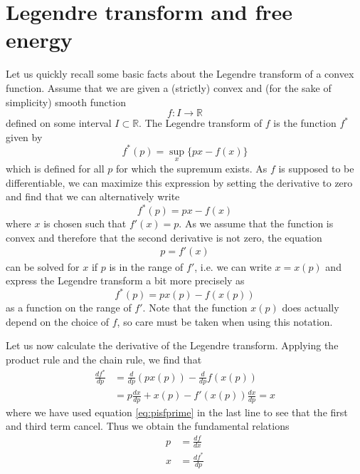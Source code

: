 \documentclass[a4paper, draft]{report}
\numberwithin{section}{chapter}
\numberwithin{equation}{chapter}
\theoremstyle{own}
\theoremstyle{remark}
\newcommand{\R}{\mathbb{R}}
\begin{document}
\section{Legendre transform and free energy}

Let us quickly recall some basic facts about the Legendre transform of a convex function. Assume that we are given a (strictly) convex and (for the sake of simplicity) smooth function
$$
f \colon I \rightarrow \R
$$
defined on some interval $I \subset \R$. The Legendre transform of $f$ is the function $f^*$ given by
$$
f^*(p) = \sup_{x} \{ px - f(x)\}
$$
which is defined for all $p$ for which the supremum exists. As $f$ is supposed to be differentiable, we can maximize this expression by setting the derivative to zero and find that we can alternatively write
$$
f^*(p) = px - f(x)
$$
where $x$ is chosen such that $f'(x) = p$. As we assume that the function is convex and therefore that the second derivative is not zero, the equation
\begin{align}\label{eq:pisfprime}
p = f'(x)
\end{align}
can be solved for $x$ if $p$ is in the range of $f'$, i.e. we can write $x = x(p)$ and express the Legendre transform a bit more precisely as
$$
f^*(p) = px(p) - f(x(p))
$$
as a function on the range of $f'$. Note that the function $x(p)$ does actually depend on the choice of $f$, so care must be taken when using this notation.

Let us now calculate the derivative of the Legendre transform. Applying the product rule and the chain rule, we find that
\begin{align*}
\frac{df^*}{dp} &= \frac{d}{dp} (px(p)) - \frac{d}{dp} f(x(p)) \\
&= p \frac{dx}{dp} + x(p) - f'(x(p)) \frac{dx}{dp} = x
\end{align*}
where we have used equation \ref{eq:pisfprime} in the last line to see that the first and third term cancel. Thus we obtain the fundamental relations
\begin{align*}
p &= \frac{df}{dx} \\
x &= \frac{df^*}{dp}
\end{align*}
\end{document}
